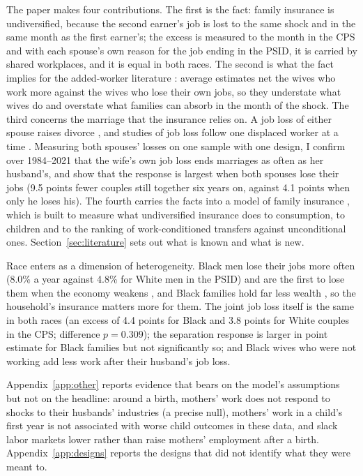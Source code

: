 The paper makes four contributions. The first is the fact: family insurance is undiversified, because the second
earner's job is lost to the same shock and in the same month as the first earner's; the excess is measured to the month
in the CPS and with each spouse's own reason for the job ending in the PSID, it is carried by shared workplaces, and it
is equal in both races. The second is what the fact implies for the added-worker literature
\citep{cullen2000does, stephens2002worker, halla2020job}: average estimates net the wives who work more against the
wives who lose their own jobs, so they understate what wives do and overstate what families can absorb in the month of
the shock. The third concerns the marriage that the insurance relies on. A job loss of either spouse raises
divorce \citep{charles2004job}, and studies of job loss follow one displaced worker at a time
\citep{eliason2012lost, athey2026heterogeneous}. Measuring both spouses' losses on one sample with one design, I
confirm over 1984--2021 that the wife's own job loss ends marriages as often as her husband's, and show that the
response is largest when both spouses lose their jobs (9.5 points fewer couples still together six years on, against
4.1 points when only he loses his). The fourth carries the facts into a
model of family insurance \citep{birinci2019spousal}, which is built to measure what undiversified insurance does to
consumption, to children and to the ranking of work-conditioned transfers against unconditional ones. Section~\ref{sec:literature} sets out what is known and what is new.

Race enters as a dimension of heterogeneity. Black men lose their jobs more often (8.0\% a year against 4.8\% for
White men in the PSID) and are the first to lose them when the economy weakens \citep{couch2010last}, and Black families
hold far less wealth \citep{derenoncourt2023wealth}, so the household's insurance matters more for them. The joint job
loss itself is the same in both races (an excess of 4.4 points for Black and 3.8 points for White couples in the CPS;
difference $p=0.309$); the separation response is larger in point estimate for Black families but not significantly so; and Black wives who were not working add less work
after their husband's job loss.

Appendix~\ref{app:other} reports evidence that bears on the model's assumptions but not on the headline: around a birth,
mothers' work does not respond to shocks to their husbands' industries (a precise null), mothers' work in a child's
first year is not associated with worse child outcomes in these data, and slack labor markets lower rather than raise
mothers' employment after a birth. Appendix~\ref{app:designs} reports the designs that did not identify what they were
meant to.
